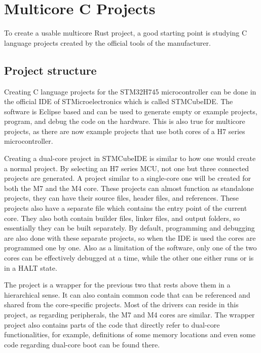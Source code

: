\chapter{Multicore C Projects}

To create a usable multicore Rust project, a good starting point is studying C language projects created by the official tools of the manufacturer.

\section{Project structure}

Creating C language projects for the STM32H745 microcontroller can be done in the official IDE of STMicroelectronics which is called STMCubeIDE. The software is Eclipse based and can be used to generate empty or example projects, program, and debug the code on the hardware. This is also true for multicore projects, as there are now example projects that use both cores of a H7 series microcontroller. \cite{CExamples}

Creating a dual-core project in STMCubeIDE is similar to how one would create a normal project. By selecting an H7 series MCU, not one but three connected projects are generated. A project similar to a single-core one will be created for both the M7 and the M4 core. These projects can almost function as standalone projects, they can have their source files, header files, and references. These projects also have a separate  file which contains the entry point of the current core. They also both contain builder files, linker files, and output folders, so essentially they can be built separately. By default, programming and debugging are also done with these separate projects, so when the IDE is used the cores are programmed one by one. Also as a limitation of the software, only one of the two cores can be effectively debugged at a time, while the other one either runs or is in a HALT state.

The project is a wrapper for the previous two that rests above them in a hierarchical sense. It can also contain common code that can be referenced and shared from the core-specific projects. Most of the drivers can reside in this project, as regarding peripherals, the M7 and M4 cores are similar. The wrapper project also contains parts of the code that directly refer to dual-core functionalities, for example, definitions of some memory locations and even some code regarding dual-core boot can be found there.

